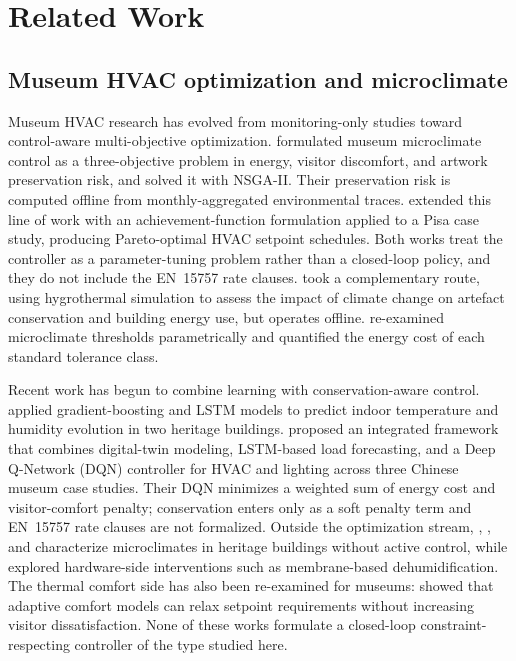 \section{Related Work}\label{sec:related}

\subsection{Museum HVAC optimization and microclimate}

Museum HVAC research has evolved from monitoring-only studies toward
control-aware multi-objective optimization. \citet{ascione2018museum}
formulated museum microclimate control as a three-objective problem in
energy, visitor discomfort, and artwork preservation risk, and solved it
with NSGA-II. Their preservation risk is computed offline from
monthly-aggregated environmental traces.
\citet{schito2020museum} extended this line of work with an
achievement-function formulation applied to a Pisa case study, producing
Pareto-optimal HVAC setpoint schedules. Both works treat the controller
as a parameter-tuning problem rather than a closed-loop policy, and they
do not include the EN~15757 rate clauses.
\citet{coelho2020museum} took a complementary route, using hygrothermal
simulation to assess the impact of climate change on artefact
conservation and building energy use, but operates offline. \citet{verticchio2024microclimate} re-examined
microclimate thresholds parametrically and quantified the energy cost of
each standard tolerance class.

Recent work has begun to combine learning with conservation-aware
control. \citet{boesgaard2022heritage} applied gradient-boosting and
LSTM models to predict indoor temperature and humidity evolution in two
heritage buildings. \citet{green_smart_museums_2025} proposed an
integrated framework that combines digital-twin modeling, LSTM-based load
forecasting, and a Deep Q-Network (DQN) controller for HVAC and lighting
across three Chinese museum case studies. Their DQN minimizes a weighted
sum of energy cost and visitor-comfort penalty; conservation enters only
as a soft penalty term and EN~15757 rate clauses are not formalized.
Outside the optimization stream, \citet{museum_no_hvac_2025},
\citet{greek_museum_2024}, and \citet{coherence_heritage_2025}
characterize microclimates in heritage buildings without active control,
while \citet{membrane_dehumid_museum_2025} explored hardware-side
interventions such as membrane-based dehumidification. The thermal
comfort side has also been re-examined for museums:
\citet{mudejar2024adaptive} showed that adaptive comfort models
\citep{ashrae552020,en167982020} can relax setpoint requirements without
increasing visitor dissatisfaction. None of these works formulate a
closed-loop constraint-respecting controller of the type studied here.

